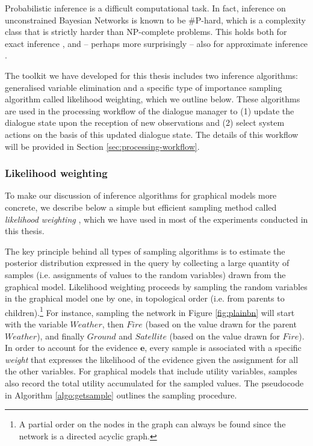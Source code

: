 Probabilistic inference is a difficult computational task.  In fact, inference on unconstrained Bayesian Networks is known to be {\#}P-hard, which is a complexity class that is strictly harder than NP-complete problems.  This holds both for exact inference \citep{Cooper90}, and -- perhaps more surprisingly -- also for approximate inference \citep{Dagum1993}.  


The \opendial toolkit we have developed for this thesis includes two inference algorithms: generalised variable elimination \citep[][p. 1103]{Koller+Friedman:09} and a specific type of importance sampling algorithm called likelihood weighting, which we outline below. These algorithms are used in the processing workflow of the dialogue manager to (1) update the dialogue state upon the reception of new observations and (2) select system actions on the basis of this updated dialogue state. The details of this workflow will be provided in Section \ref{sec:processing-workflow}.  

\subsubsection*{Likelihood weighting} 

To make our discussion of inference algorithms for graphical models more concrete, we describe below a simple but efficient sampling method called \textit{likelihood weighting} \citep{FungC89}, which we have used in most of the experiments conducted in this thesis.  

The key principle behind all types of sampling algorithms is to estimate the posterior distribution expressed in the query by collecting a large quantity of samples (i.e. assignments of values to the random variables) drawn from the graphical model.  Likelihood weighting proceeds by sampling the random variables in the graphical model one by one, in topological order (i.e. from parents to children).\footnote{A partial order on the nodes in the graph can always be found since the network is a directed acyclic graph.} For instance, sampling the network in Figure \ref{fig:plainbn} will start with the variable $\mathit{Weather}$, then $\mathit{Fire}$ (based on the value drawn for the parent $\mathit{Weather}$), and finally $\mathit{Ground}$ and $\mathit{Satellite}$ (based on the value drawn for $\mathit{Fire}$).  In order to account for the evidence $\mathbf{e}$, every sample is associated with a specific \textit{weight} that expresses the likelihood of the evidence given the assignment for all the other variables.  For graphical models that include utility variables, samples also record the total utility accumulated for the sampled values. The pseudocode in Algorithm \ref{algo:getsample} outlines the sampling procedure.  

